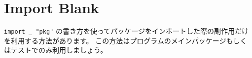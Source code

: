 
\section{Import Blank}

\texttt{import \_ "pkg"} の書き方を使ってパッケージをインポートした際の副作用だけを利用する方法があります。 この方法はプログラムのメインパッケージもしくはテストでのみ利用しましょう。
